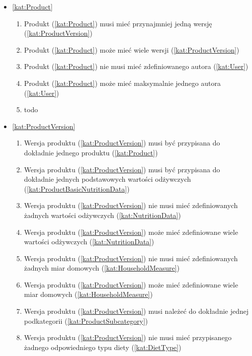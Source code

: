 \begin{itemize}[label={\textbf{Reguły dla}}, wide, labelwidth=!, labelindent=0pt]
\begin{enumerate}[label={\textbf{REG/\protect\threedigits{\arabic{enumi}}}}, wide, labelwidth=!, align=left, leftmargin=3cm, resume]
    \end{enumerate}
    \item\ref{kat:Product}
    \begin{enumerate}[label={\textbf{REG/\protect\threedigits{\arabic{enumi}}}}, wide, labelwidth=!, align=left, leftmargin=3cm, resume]
        \item Produkt (\ref{kat:Product}) musi mieć przynajmniej jedną wersję (\ref{kat:ProductVersion})
        \item Produkt (\ref{kat:Product}) może mieć wiele wersji (\ref{kat:ProductVersion})
        \item Produkt (\ref{kat:Product}) nie musi mieć zdefiniowanego autora (\ref{kat:User})
        \item Produkt (\ref{kat:Product}) może mieć maksymalnie jednego autora (\ref{kat:User})
        \item todo
    \end{enumerate}
    \item\ref{kat:ProductVersion}
    \begin{enumerate}[label={\textbf{REG/\protect\threedigits{\arabic{enumi}}}}, wide, labelwidth=!, align=left, leftmargin=3cm, resume]
        \item Wersja produktu (\ref{kat:ProductVersion}) musi być przypisana do dokładnie jednego produktu  (\ref{kat:Product})
        \item Wersja produktu (\ref{kat:ProductVersion}) musi być przypisana do dokładnie jednych podstawowych wartości odżywczych (\ref{kat:ProductBasicNutritionData})
        \item Wersja produktu (\ref{kat:ProductVersion}) nie musi mieć zdefiniowanych żadnych wartości odżywczych (\ref{kat:NutritionData})
        \item Wersja produktu (\ref{kat:ProductVersion}) może mieć zdefiniowane wiele wartości odżywczych (\ref{kat:NutritionData})
        \item Wersja produktu (\ref{kat:ProductVersion}) nie musi mieć zdefiniowanych żadnych miar domowych (\ref{kat:HouseholdMeasure})
        \item Wersja produktu (\ref{kat:ProductVersion}) może mieć zdefiniowane wiele miar domowych (\ref{kat:HouseholdMeasure})
        \item Wersja produktu (\ref{kat:ProductVersion}) musi należeć do dokładnie jednej podkategorii (\ref{kat:ProductSubcategory})
        \item Wersja produktu (\ref{kat:ProductVersion}) nie musi mieć przypisanego żadnego odpowiedniego typu diety (\ref{kat:DietType})

\end{enumerate}
\end{itemize}
